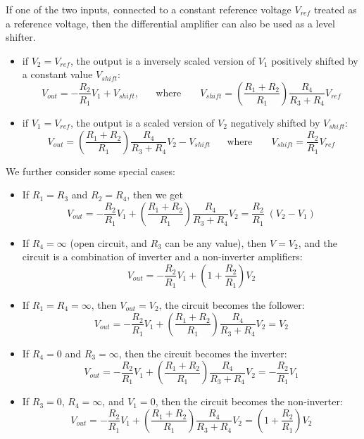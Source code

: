 \documentclass{article}
\begin{document}
\begin{itemize}
  If one of the two inputs, connected to a constant reference voltage 
  $V_{ref}$ treated as a reference voltage, then the differential amplifier
  can also be used as a level shifter. 
  \begin{itemize}
  \item if $V_2=V_{ref}$, the output is a inversely scaled version of $V_1$ 
    positively shifted by a constant value $V_{shift}$:
    \begin{equation}
      V_{out}=-\frac{R_2}{R_1}V_1+V_{shift},
      \;\;\;\;\;\;\mbox{where}\;\;\;\;\;\;\;
      V_{shift}=\left(\frac{R_1+R_2}{R_1}\right)\frac{R_4}{R_3+R_4}V_{ref} 
    \end{equation}
  \item if $V_1=V_{ref}$, the output is a scaled version of $V_2$ 
    negatively shifted by $V_{shift}$:
    \begin{equation}
      V_{out}=\left(\frac{R_1+R_2}{R_1}\right)\frac{R_4}{R_3+R_4}V_2 
      -V_{shift}
      \;\;\;\;\;\;\mbox{where}\;\;\;\;\;\;\;
      V_{shift}=\frac{R_2}{R_1}V_{ref}
    \end{equation}
  \end{itemize}

  We further consider some special cases:
  \begin{itemize}
  \item If $R_1=R_3$ and $R_2=R_4$, then we get
    \begin{equation}
      V_{out}=-\frac{R_2}{R_1}V_1+\left(\frac{R_1+R_2}{R_1}\right)\frac{R_4}{R_3+R_4}V_2 
      =\frac{R_2}{R_1}\;(V_2-V_1)	
    \end{equation}
  \item If $R_4=\infty$ (open circuit, and $R_3$ can be any value), then $V=V_2$,
    and the circuit is a combination of inverter and a non-inverter amplifiers:
    \begin{equation}
      V_{out}=-\frac{R_2}{R_1}V_1+\left(1+\frac{R_2}{R_1}\right)V_2 
    \end{equation}
  \item If $R_1=R_4=\infty$, then $V_{out}=V_2$, the circuit becomes the 
    follower:
    \begin{equation}
      V_{out}=-\frac{R_2}{R_1}V_1+\left(\frac{R_1+R_2}{R_1}\right)\frac{R_4}{R_3+R_4}V_2 
      =V_2
    \end{equation}
  \item If $R_4=0$ and $R_3=\infty$, then the circuit becomes the inverter:
    \begin{equation} 
      V_{out}=-\frac{R_2}{R_1}V_1+\left(\frac{R_1+R_2}{R_1}\right)\frac{R_4}{R_3+R_4}V_2 
      =-\frac{R_2}{R_1} V_1
    \end{equation}
  \item If $R_3=0$, $R_4=\infty$, and $V_1=0$, then the circuit becomes the 
    non-inverter:
    \begin{equation}
      V_{out}=-\frac{R_2}{R_1}V_1+\left(\frac{R_1+R_2}{R_1}\right)\frac{R_4}{R_3+R_4}V_2 
      =\left(1+\frac{R_2}{R_1}\right)V_2 
    \end{equation}
  \end{itemize}


\end{itemize}
\end{document}
